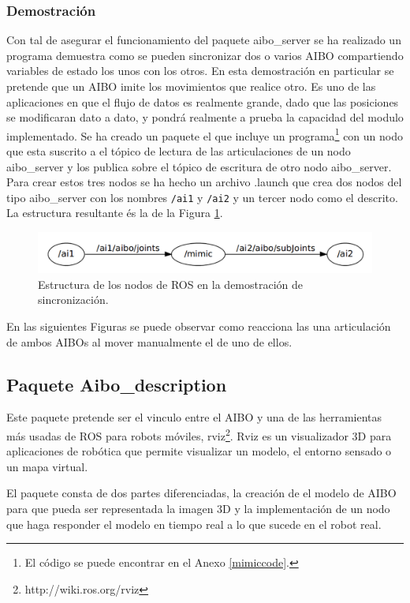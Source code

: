 \documentclass[12pt,a4paper,final,twoside]{article}
\begin{document}
\subsubsection{Demostración}
Con tal de asegurar el funcionamiento del paquete aibo{\_}server se ha realizado un programa demuestra como se pueden sincronizar dos o varios AIBO compartiendo variables de estado los unos con los otros. 
En esta demostración en particular se pretende que un AIBO imite los movimientos que realice otro. Es uno de las aplicaciones en que el flujo de datos es realmente grande, dado que las posiciones se modificaran dato a dato, y pondrá realmente a prueba la capacidad del modulo implementado.
Se ha creado un paquete el que incluye un programa\footnote{El código se puede encontrar en el Anexo \ref{mimiccode}.} con un nodo que esta suscrito a el tópico de lectura de las articulaciones de un nodo aibo{\_}server y los publica sobre el tópico de escritura de otro nodo aibo{\_}server. Para crear estos tres nodos se ha hecho un archivo .launch que crea dos nodos del tipo aibo{\_}server con los nombres \texttt{/ai1} y \texttt{/ai2} y un tercer nodo como el descrito. La estructura resultante és la de la Figura \ref{fig:mimic}.


\begin{figure}[H]
	\centering
    \includegraphics[scale=0.75]{images/mimic.pdf}
	 \caption{Estructura de los nodos de ROS en la demostración de sincronización.}
  \label{fig:mimic}
\end{figure}

En las siguientes Figuras se puede observar como reacciona las una articulación de ambos AIBOs al mover manualmente el de uno de ellos. 

\subsection{Paquete Aibo{\_}description }
Este paquete pretende ser el vinculo entre el AIBO y una de las herramientas más usadas de ROS para robots móviles, rviz\footnote{http://wiki.ros.org/rviz}. Rviz es un visualizador 3D para aplicaciones de robótica que permite visualizar un modelo, el entorno sensado o un mapa virtual. 

El paquete consta de dos partes diferenciadas, la creación de el modelo de AIBO para que pueda ser representada la imagen 3D y la implementación de un nodo que haga responder el modelo en tiempo real a lo que sucede en el robot real.
\end{document}
